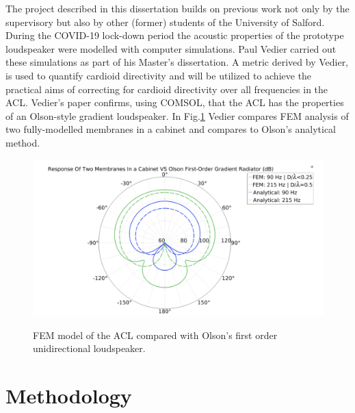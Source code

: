 \documentclass{report}
\begin{document}
        The project described in this dissertation builds on previous work not only by the supervisory but also by other (former) students of the University of Salford.
        During the COVID-19 lock-down period the acoustic properties of the prototype loudspeaker were modelled with computer simulations.
        Paul Vedier carried out these simulations as part of his Master's dissertation.
        A metric derived by Vedier, is used to quantify cardioid directivity and will be utilized to achieve the practical aims of correcting for cardioid directivity over all frequencies in the ACL.
        Vedier's paper confirms, using COMSOL, that the ACL has the properties of an Olson-style gradient loudspeaker.
        In Fig.\ref{vedierPolar} Vedier compares FEM analysis of two fully-modelled membranes in a cabinet and compares to Olson's analytical method.
        \begin{figure}[H]
            \centering
            \includegraphics[scale=0.5]{figs/vedierPolar.png}
            \caption{FEM model of the ACL compared with Olson's first order unidirectional loudspeaker.}\cite{vedier}
            \label{vedierPolar}
        \end{figure}



\chapter{Methodology}
\end{document}

